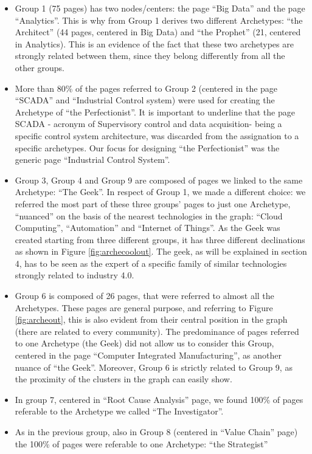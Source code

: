 \documentclass[b5paper,]{book}
\theoremstyle{definition}
\theoremstyle{definition}
\theoremstyle{definition}
\theoremstyle{remark}
\begin{document}
\begin{itemize}
\item
  Group 1 (75 pages) has two nodes/centers: the page ``Big Data'' and
  the page ``Analytics''. This is why from Group 1 derives two different
  Archetypes: ``the Architect'' (44 pages, centered in Big Data) and
  ``the Prophet'' (21, centered in Analytics). This is an evidence of
  the fact that these two archetypes are strongly related between them,
  since they belong differently from all the other groups.
\item
  More than 80\% of the pages referred to Group 2 (centered in the page
  ``SCADA'' and ``Industrial Control system) were used for creating the
  Archetype of ``the Perfectionist''. It is important to underline that
  the page SCADA - acronym of Supervisory control and data acquisition-
  being a specific control system architecture, was discarded from the
  assignation to a specific archetypes. Our focus for designing ``the
  Perfectionist'' was the generic page ``Industrial Control System''.
\item
  Group 3, Group 4 and Group 9 are composed of pages we linked to the
  same Archetype: ``The Geek''. In respect of Group 1, we made a
  different choice: we referred the most part of these three groups'
  pages to just one Archetype, ``nuanced'' on the basis of the nearest
  technologies in the graph: ``Cloud Computing'', ``Automation'' and
  ``Internet of Things''. As the Geek was created starting from three
  different groups, it has three different declinations as shown in
  Figure \ref{fig:archecoolout}. The geek, as will be explained in
  section 4, has to be seen as the expert of a specific family of
  similar technologies strongly related to industry 4.0.
\item
  Group 6 is composed of 26 pages, that were referred to almost all the
  Archetypes. These pages are general purpose, and referring to Figure
  \ref{fig:archeout}, this is also evident from their central position
  in the graph (there are related to every community). The predominance
  of pages referred to one Archetype (the Geek) did not allow us to
  consider this Group, centered in the page ``Computer Integrated
  Manufacturing'', as another nuance of ``the Geek''. Moreover, Group 6
  is strictly related to Group 9, as the proximity of the clusters in
  the graph can easily show.
\item
  In group 7, centered in ``Root Cause Analysis'' page, we found 100\%
  of pages referable to the Archetype we called ``The Investigator''.
\item
  As in the previous group, also in Group 8 (centered in ``Value Chain''
  page) the 100\% of pages were referable to one Archetype: ``the
  Strategist''
\end{itemize}
\end{document}
